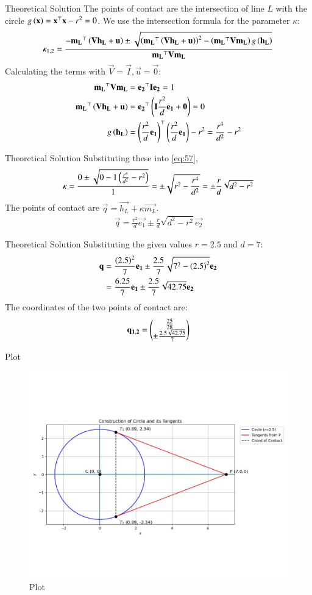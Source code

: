 \documentclass{beamer}
\begin{document}
\begin{frame}{Theoretical Solution}
The points of contact are the intersection of line $L$ with the circle $g\left(\mathbf{x}\right) = \mathbf{x}^\top\mathbf{x}-r^2=0$.
We use the intersection formula for the parameter $\kappa$:
\begin{align}
    \kappa_{1,2} = \frac{-\mathbf{m_L}^\top\left(\mathbf{V}\mathbf{h_L}+\mathbf{u}\right) \pm \sqrt{\left(\mathbf{m_L}^\top\left(\mathbf{V}\mathbf{h_L}+\mathbf{u}\right)\right)^2 - \left(\mathbf{m_L}^\top\mathbf{V}\mathbf{m_L}\right)g\left(\mathbf{h_L}\right)}}{\mathbf{m_L}^\top\mathbf{V}\mathbf{m_L}} \label{eq:57}
\end{align}
Calculating the terms with $\vec{V}=\vec{I}, \vec{u}=\vec{0}$:
\begin{align}
    \mathbf{m_L}^\top\mathbf{V}\mathbf{m_L} &= \mathbf{e_2}^\top\mathbf{I}\mathbf{e_2} = 1 \\
    \mathbf{m_L}^\top\left(\mathbf{V}\mathbf{h_L}+\mathbf{u}\right) &= \mathbf{e_2}^\top\left(\mathbf{I}\frac{r^2}{d}\mathbf{e_1}+\mathbf{0}\right) = 0 \\
    g\left(\mathbf{h_L}\right) &= \left(\frac{r^2}{d}\mathbf{e_1}\right)^\top\left(\frac{r^2}{d}\mathbf{e_1}\right) - r^2 = \frac{r^4}{d^2} - r^2
\end{align}
\end{frame}

\begin{frame}{Theoretical Solution}
Substituting these into \eqref{eq:57},
\begin{align}
    \kappa = \frac{0 \pm \sqrt{0 - 1\left(\frac{r^4}{d^2}-r^2\right)}}{1} = \pm\sqrt{r^2 - \frac{r^4}{d^2}} = \pm \frac{r}{d}\sqrt{d^2-r^2}
\end{align}
The points of contact are $\vec{q} = \vec{h_L} + \kappa\vec{m_L}$.
\begin{align}
    \vec{q} = \frac{r^2}{d}\vec{e_1} \pm \frac{r}{d}\sqrt{d^2-r^2}\vec{e_2}
\end{align}
\end{frame}

\begin{frame}{Theoretical Solution}
Substituting the given values $r=2.5$ and $d=7$:
\begin{align}
    \mathbf{q} &= \frac{\left(2.5\right)^2}{7}\mathbf{e_1} \pm \frac{2.5}{7}\sqrt{7^2 - \left(2.5\right)^2}\mathbf{e_2} \\
    &= \frac{6.25}{7}\mathbf{e_1} \pm \frac{2.5}{7}\sqrt{42.75}\mathbf{e_2}
\end{align}
The coordinates of the two points of contact are:
\begin{align}
    \mathbf{q_{1,2}} = \begin{pmatrix}\frac{25}{28} \\ \pm \frac{2.5\sqrt{42.75}}{7}\end{pmatrix}
\end{align}
\end{frame}

\begin{frame}{Plot}
\begin{figure}
	\centering
	\includegraphics[width=0.5\columnwidth]{../figs/plot_c.jpg}
	\caption{Plot}
	\label{fig:fig}
\end{figure}
\end{frame}
\end{document}
